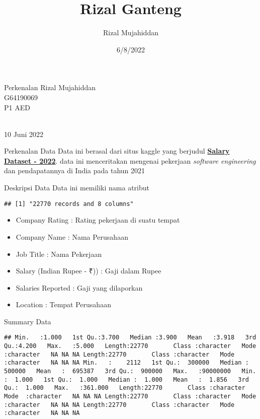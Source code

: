 \documentclass[
  ignorenonframetext,
]{beamer}
\title{Rizal Ganteng}
\author{Rizal Mujahiddan}
\date{6/8/2022}
\providecommand{\tightlist}{%
  \setlength{\itemsep}{0pt}\setlength{\parskip}{0pt}}
\begin{document}
\frame{\titlepage}

\begin{frame}{Perkenalan}
\protect\hypertarget{perkenalan}{}
Rizal Mujahiddan\\
G64190069\\
P1 AED\\
\strut \\
10 Juni 2022
\end{frame}

\begin{frame}{Perkenalan Data}
\protect\hypertarget{perkenalan-data}{}
Data ini berasal dari situs kaggle yang berjudul
\href{https://www.kaggle.com/datasets/iamsouravbanerjee/software-professional-salaries-2022?select=Salary_Dataset_with_Extra_Features.csv}{\textbf{Salary
Dataset - 2022}}. data ini menceritakan mengenai pekerjaan
\emph{software engineering} dan pendapatannya di India pada tahun 2021
\end{frame}

\begin{frame}[fragile]{Deskripsi Data}
\protect\hypertarget{deskripsi-data}{}
Data ini memiliki nama atribut

\begin{verbatim}
## [1] "22770 records and 8 columns"
\end{verbatim}

\begin{itemize}
\tightlist
\item
  Company Rating : Rating pekerjaan di suatu tempat
\item
  Company Name : Nama Perusahaan
\item
  Job Title : Nama Pekerjaan
\item
  Salary (Indian Rupee - ₹)) : Gaji dalam Rupee
\item
  Salaries Reported : Gaji yang dilaporkan
\item
  Location : Tempat Perusahaan
\end{itemize}
\end{frame}

\begin{frame}[fragile]{Summary Data}
\protect\hypertarget{summary-data}{}
\begin{verbatim}
## Min.   :1.000   1st Qu.:3.700   Median :3.900   Mean   :3.918   3rd Qu.:4.200   Max.   :5.000   Length:22770       Class :character   Mode  :character   NA NA NA Length:22770       Class :character   Mode  :character   NA NA NA Min.   :    2112   1st Qu.:  300000   Median :  500000   Mean   :  695387   3rd Qu.:  900000   Max.   :90000000   Min.   :  1.000   1st Qu.:  1.000   Median :  1.000   Mean   :  1.856   3rd Qu.:  1.000   Max.   :361.000   Length:22770       Class :character   Mode  :character   NA NA NA Length:22770       Class :character   Mode  :character   NA NA NA Length:22770       Class :character   Mode  :character   NA NA NA
\end{verbatim}
\end{frame}
\end{document}
